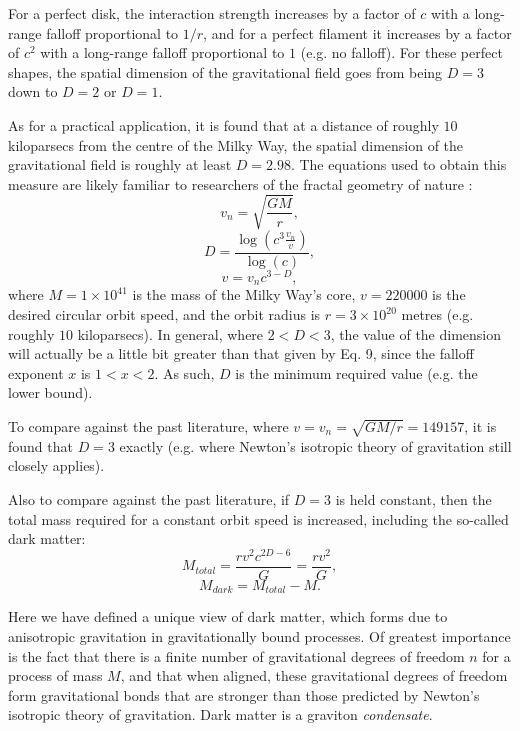 \documentclass[12pt]{article}
\begin{document}
For a perfect disk, the interaction strength increases by a factor of $c$ with a long-range falloff proportional to $1/r$, and for a perfect filament it increases by a factor of $c^2$ with a long-range falloff proportional to $1$ (e.g. no falloff).
For these perfect shapes, the spatial dimension of the gravitational field goes from being $D = 3$ down to $D = 2$ or $D = 1$.

As for a practical application, it is found that at a distance of roughly $10$ kiloparsecs from the centre of the Milky Way, the spatial dimension of the gravitational field is roughly at least $D = 2.98$.
The equations used to obtain this measure are likely familiar to researchers of the fractal geometry of nature \cite{mandelbrot}:
\begin{equation}
v_n = \sqrt{\frac{GM}{r}},
\end{equation}
\begin{equation}
D = \frac{\log \left( c^3 \frac{v_n}{v} \right) } { \log(c) },
\end{equation}
\begin{equation}
v = v_n c^{3 - D},
\end{equation}
where $M = 1 \times 10^{41}$ is the mass of the Milky Way's core, $v = 220000$ is the desired circular orbit speed, and the orbit radius is $r = 3 \times 10^{20}$ metres (e.g. roughly $10$ kiloparsecs).
In general, where $ 2 < D < 3$, the value of the dimension will actually be a little bit greater than that given by Eq. 9, since the falloff exponent $x$ is $1 < x < 2$.
As such, $D$ is the minimum required value (e.g. the lower bound).

To compare against the past literature, where $v = v_n = \sqrt{GM/r} = 149157$, it is found that $D = 3$ exactly (e.g. where Newton's isotropic theory of gravitation still closely applies).

Also to compare against the past literature, if $D = 3$ is held constant, then the total mass required for a constant orbit speed is increased, including the so-called dark matter:
\begin{equation}
M_{total} = \frac{r v^2 c^{2D - 6}}{G} = \frac{r v^2}{G},
\end{equation}
\begin{equation}
M_{dark} = M_{total} - M.
\end{equation}

Here we have defined a unique view of dark matter, which forms due to anisotropic gravitation in gravitationally bound processes.
Of greatest importance is the fact that there is a finite number of gravitational degrees of freedom $n$ for a process of mass $M$, and that when aligned, these gravitational degrees of freedom form gravitational bonds that are stronger than those predicted by Newton's isotropic theory of gravitation.
Dark matter is a graviton {\textit{condensate}}.
\end{document}
